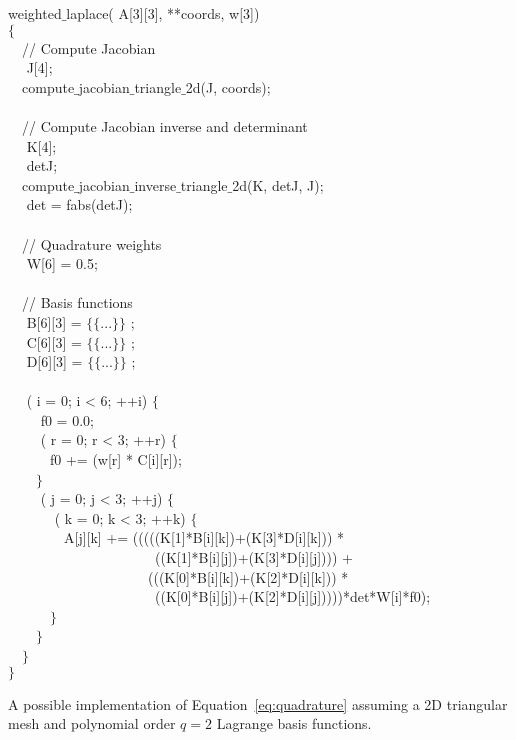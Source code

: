 \begin{algorithm}[t]
\scriptsize\ttfamily
{}

 weighted$\_$laplace( A[3][3],  **coords,  w[3]) \\
$\lbrace$ \\
~~// Compute Jacobian \\
~~ J[4]; \\
~~compute$\_$jacobian$\_$triangle$\_$2d(J, coords); \\
~~\\
~~// Compute Jacobian inverse and determinant \\
~~ K[4]; \\
~~ detJ; \\
~~compute$\_$jacobian$\_$inverse$\_$triangle$\_$2d(K, detJ, J); \\
~~ det = fabs(detJ); \\
~~\\
~~// Quadrature weights \\
~~ W[6] = {0.5}; \\
~~\\
~~// Basis functions \\
~~ B[6][3] = $\lbrace\lbrace$...$\rbrace\rbrace$ ;\\
~~ C[6][3] = $\lbrace\lbrace$...$\rbrace\rbrace$ ;\\
~~ D[6][3] = $\lbrace\lbrace$...$\rbrace\rbrace$ ;\\
~~\\
~~ ( i = 0; i < 6; ++i) $\lbrace$ \\
~~~~ f0  = 0.0;\\
~~~~ ( r  = 0; r < 3; ++r) $\lbrace$ \\
~~~~~~f0 += (w[r] * C[i][r]);\\
~~~~$\rbrace$ \\
~~~~ ( j = 0; j < 3; ++j) $\lbrace$\\
~~~~~~ ( k = 0; k < 3; ++k) $\lbrace$\\
~~~~~~~~A[j][k] += (((((K[1]*B[i][k])+(K[3]*D[i][k])) * \\
~~~~~~~~~~~~~~~~~~~~~((K[1]*B[i][j])+(K[3]*D[i][j]))) + \\
~~~~~~~~~~~~~~~~~~~~(((K[0]*B[i][k])+(K[2]*D[i][k])) * \\
~~~~~~~~~~~~~~~~~~~~~((K[0]*B[i][j])+(K[2]*D[i][j]))))*det*W[i]*f0);\\
~~~~~~$\rbrace$\\
~~~~$\rbrace$\\
~~$\rbrace$\\
$\rbrace$
\caption{A possible implementation of Equation~\ref{eq:quadrature} assuming a 2D triangular mesh and polynomial order $q=2$ Lagrange basis functions.}
\label{code:weighted-laplace}
\end{algorithm}

